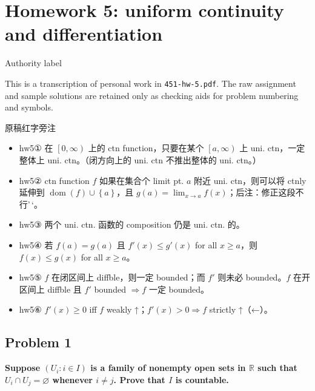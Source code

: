 \chapter{Homework 5: uniform continuity and differentiation}

\begin{qlremark}{Authority label}

This is a transcription of personal work in \texttt{451-hw-5.pdf}. The raw assignment and sample solutions are retained only as checking aids for problem numbering and symbols.

\end{qlremark}

\begin{qlremark}{原稿红字旁注}

\begin{itemize}
\tightlist
\item
  hw5① 在 \(\left\lbrack {0,\infty} \right)\) 上的 ctn function，只要在某个 \(\left\lbrack {a,\infty} \right)\) 上 uni. ctn，一定整体上 uni. ctn。（闭方向上的 uni. ctn 不推出整体的 uni. ctn。）
\item
  hw5② ctn function \(f\) 如果在集合个 limit pt. \(a\) 附近 uni. ctn，则可以将 ctnly 延伸到 \(\operatorname{dom}(f) \cup \left\{ a \right\}\)，且 \(g(a) = \lim_{x\rightarrow a}f(x)\)；后注：修正这段不行'\,`。
\item
  hw5③ 两个 uni. ctn. 函数的 composition 仍是 uni. ctn. 的。
\item
  hw5④ 若 \(f(a) = g(a)\) 且 \(f'(x) \leq g'(x)\) for all \(x \geq a\)，则 \(f(x) \leq g(x)\) for all \(x \geq a\)。
\item
  hw5⑤ \(f\) 在闭区间上 diffble，则一定 bounded；而 \(f'\) 则未必 bounded。\(f\) 在开区间上 diffble 且 \(f'\) bounded \(\Rightarrow f\) 一定 bounded。
\item
  hw5⑥ \(f'(x) \geq 0\) iff \(f\) weakly ↑；\(f'(x) > 0\Rightarrow f\) strictly ↑（←）。
\end{itemize}

\end{qlremark}

\section{Problem 1}

\textbf{Suppose \(\left( {U_{i}:i \in I} \right)\) is a family of nonempty open sets in \(\mathbb{R}\) such that \(U_{i} \cap U_{j} = \varnothing\) whenever \(i \neq j\). Prove that \(I\) is countable.}

